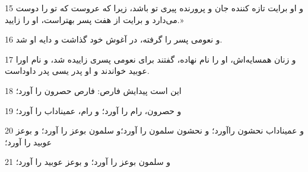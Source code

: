 \par 15 و او برایت تازه کننده جان و پرورنده پیری تو باشد، زیرا که عروست که تو را دوست می‌دارد و برایت از هفت پسر بهتراست، او را زایید.»
\par 16 و نعومی پسر را گرفته، در آغوش خود گذاشت و دایه او شد.
\par 17 و زنان همسایه‌اش، او را نام نهاده، گفتند برای نعومی پسری زاییده شد، و نام اورا عوبید خواندند و او پدر یسی پدر داوداست.
\par 18 این است پیدایش فارص: فارص حصرون را آورد؛
\par 19 و حصرون، رام را آورد؛ و رام، عمیناداب را آورد؛
\par 20 و عمیناداب نحشون راآورد؛ و نحشون سلمون را آورد؛و سلمون بوعز را آورد؛ و بوعز عوبید را آورد؛
\par 21 و سلمون بوعز را آورد؛ و بوعز عوبید را آورد؛



